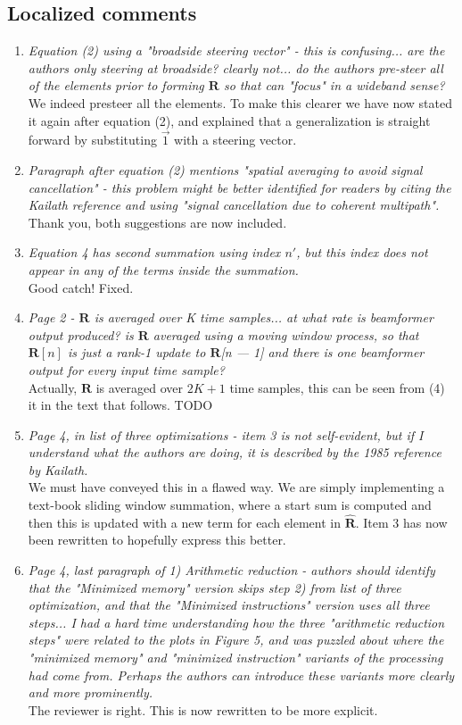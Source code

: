 \documentclass[11pt]{article} %
\newcommand\mat[1]{\boldsymbol{#1}}
\newcommand\1{\vec 1}
\newcommand*\R{\mat R}
\newcommand*\eR{\mat{\hat R}}
\newcommand\q[1]{\textit{#1}}
\newcommand\qi[1]{\item\q{#1}}
\newcommand\ans[1]{#1}
\newcommand\ai[1]{\\[.5\baselineskip]\ans{#1}}
\begin{document}
\subsection{Localized comments}

\begin{enumerate}
\qi{Equation (2) using a "broadside steering vector" - this is confusing... are the authors only steering at broadside? clearly not... do the authors pre-steer all of the elements prior to forming $\R$ so that can "focus" in a wideband sense?}
\ai{We indeed presteer all the elements. To make this clearer we have now stated it again after equation (2), and explained that a generalization is straight forward by substituting $\1$ with a steering vector.}
%
\qi{Paragraph after equation (2) mentions "spatial averaging to avoid signal cancellation" - this problem might be better identified for readers by citing the Kailath reference and using "signal cancellation due to coherent multipath".}
\ai{Thank you, both suggestions are now included.}
%
\qi{Equation 4 has second summation using index $n'$, but this index does not appear in any of the terms inside the summation.}
\ai{Good catch! Fixed.}
%
\qi{Page 2 - $\R$ is averaged over K time samples... at what rate is beamformer output produced? is $\R$ averaged using a moving window process, so that $\R[n]$ is just a rank-1 update to $\R$[n — 1] and there is one beamformer output for every input time sample?}
\ai{Actually, $\R$ is averaged over $2K+1$ time samples, this can be seen from (4) it in the text that follows. TODO}
%
\qi{Page 4, in list of three optimizations - item 3 is not self-evident, but if I understand what the authors are doing, it is described by the 1985 reference by Kailath.}
\ai{We must have conveyed this in a flawed way. We are simply implementing a text-book sliding window summation, where a start sum is computed and then this is updated with a new term for each element in $\eR$. Item 3 has now been rewritten to hopefully express this better.}
%
\qi{Page 4, last paragraph of 1) Arithmetic reduction - authors should identify that the "Minimized memory" version skips step 2) from list of three optimization, and that the "Minimized instructions" version uses all three steps... I had a hard time understanding how the three "arithmetic reduction steps" were related to the plots in Figure 5, and was puzzled about where the "minimized memory" and "minimized instruction" variants of the processing had come from. Perhaps the authors can introduce these variants more clearly and more prominently.}
\ai{The reviewer is right. This is now rewritten to be more explicit.}

\end{enumerate}
\end{document}
